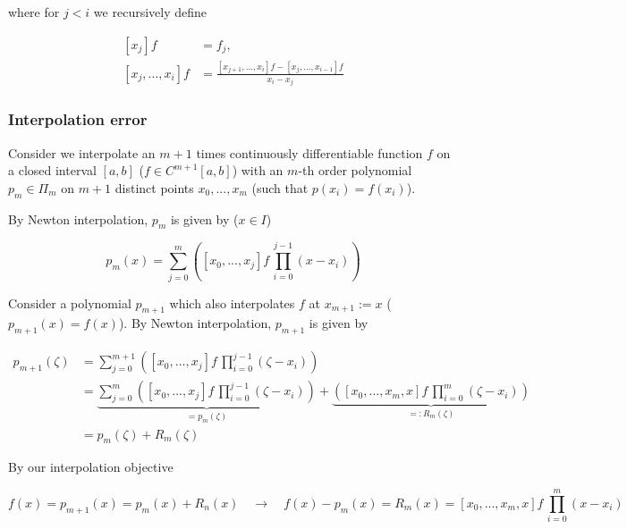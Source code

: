 where for $j<i$ we recursively define

\begin{equation}
    \begin{aligned}
        \left[x_j\right]f & = f_j, \\
        \left[x_j, \ldots, x_i\right] f &=\frac{\left[x_{j+1}, \ldots, x_i\right] f-\left[x_j, \ldots, x_{i-1}\right] f}{x_i-x_j}
    \end{aligned}
\end{equation}

\subsubsection{Interpolation error}

Consider we interpolate an $m+1$ times continuously 
differentiable function $f$ on a closed interval $[a,b]$ ($f \in C^{m+1}[a,b]$)
with an $m$-th order polynomial $p_m \in \Pi_m$ on
$m + 1$ distinct points $x_0,...,x_m$
(such that $p(x_i) = f(x_i)$).

By Newton interpolation, $p_m$ is given by ($x \in I$)

\begin{equation}
    p_m(x) = \sum_{j=0}^{m}  \left( [x_0,...,x_j] f \, \prod_{i = 0}^{j-1} (x - x_i) \right)
\end{equation}

Consider a polynomial $p_{m+1}$ which also interpolates $f$ at $x_{m+1} := x$ ($p_{m+1}(x) = f(x)$).
By Newton interpolation, $p_{m+1}$ is given by

\begin{equation}
    \begin{aligned}
        p_{m+1}(\zeta) &= \sum_{j=0}^{m+1}  \left( [x_0,...,x_j] f \, \prod_{i = 0}^{j-1} (\zeta - x_i) \right) \\
                       &= \underbrace{\sum_{j=0}^{m}  \left( [x_0,...,x_j] f \, \prod_{i = 0}^{j-1} (\zeta - x_i) \right)}_{=p_m(\zeta)} + \underbrace{\left( [x_0,...,x_m,x] f \, \prod_{i = 0}^{m} (\zeta - x_i) \right)}_{=: R_m(\zeta)} \\
                       &= p_{m}(\zeta) + R_m(\zeta)
    \end{aligned}
\end{equation}

By our interpolation objective

\begin{equation}
    f(x) = p_{m+1}(x) = p_{m}(x) + R_n(x) \quad \rightarrow \quad f(x) - p_m(x) = R_m(x) = [x_0,...,x_m,x] f \, \prod_{i = 0}^{m} (x - x_i)
\end{equation}

